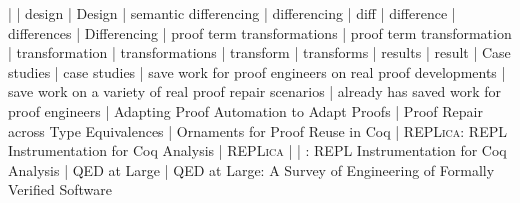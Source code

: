   | \toolnamec
{}
  | design
  | Design
  | semantic differencing
  | differencing
  | diff
  | difference
  | differences
  | Differencing
  | proof term transformations
  | proof term transformation
  | transformation
  | transformations
  | transform
  | transforms
  | results
  | result
  | Case studies
  | case studies
  | save work for proof engineers on real proof developments
  | save work on a variety of real proof repair scenarios
  | already has saved work for proof engineers
  | Adapting Proof Automation to Adapt Proofs
  | Proof Repair across Type Equivalences
  | Ornaments for Proof Reuse in Coq
  | \textsc{REPLica}: REPL Instrumentation for Coq Analysis
  | \textsc{REPLica}
  | \toolname
  | \toolname: REPL Instrumentation for Coq Analysis
  | QED at Large
  | QED at Large: A Survey of Engineering of Formally Verified Software

\makeindex

